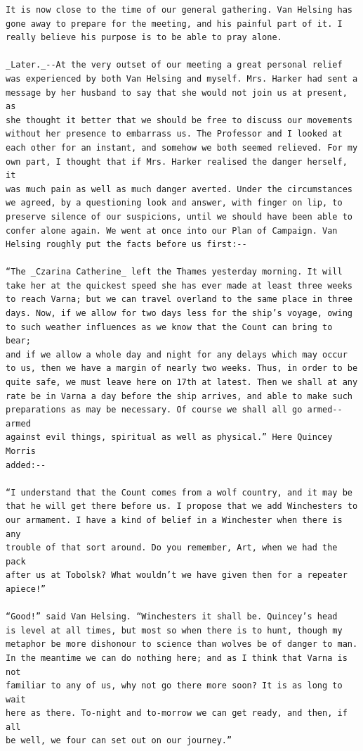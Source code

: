 \documentclass{article}
\begin{document}
\begin{verbatim}
It is now close to the time of our general gathering. Van Helsing has
gone away to prepare for the meeting, and his painful part of it. I
really believe his purpose is to be able to pray alone.

_Later._--At the very outset of our meeting a great personal relief
was experienced by both Van Helsing and myself. Mrs. Harker had sent a
message by her husband to say that she would not join us at present, as
she thought it better that we should be free to discuss our movements
without her presence to embarrass us. The Professor and I looked at
each other for an instant, and somehow we both seemed relieved. For my
own part, I thought that if Mrs. Harker realised the danger herself, it
was much pain as well as much danger averted. Under the circumstances
we agreed, by a questioning look and answer, with finger on lip, to
preserve silence of our suspicions, until we should have been able to
confer alone again. We went at once into our Plan of Campaign. Van
Helsing roughly put the facts before us first:--

“The _Czarina Catherine_ left the Thames yesterday morning. It will
take her at the quickest speed she has ever made at least three weeks
to reach Varna; but we can travel overland to the same place in three
days. Now, if we allow for two days less for the ship’s voyage, owing
to such weather influences as we know that the Count can bring to bear;
and if we allow a whole day and night for any delays which may occur
to us, then we have a margin of nearly two weeks. Thus, in order to be
quite safe, we must leave here on 17th at latest. Then we shall at any
rate be in Varna a day before the ship arrives, and able to make such
preparations as may be necessary. Of course we shall all go armed--armed
against evil things, spiritual as well as physical.” Here Quincey Morris
added:--

“I understand that the Count comes from a wolf country, and it may be
that he will get there before us. I propose that we add Winchesters to
our armament. I have a kind of belief in a Winchester when there is any
trouble of that sort around. Do you remember, Art, when we had the pack
after us at Tobolsk? What wouldn’t we have given then for a repeater
apiece!”

“Good!” said Van Helsing. “Winchesters it shall be. Quincey’s head
is level at all times, but most so when there is to hunt, though my
metaphor be more dishonour to science than wolves be of danger to man.
In the meantime we can do nothing here; and as I think that Varna is not
familiar to any of us, why not go there more soon? It is as long to wait
here as there. To-night and to-morrow we can get ready, and then, if all
be well, we four can set out on our journey.”


\end{verbatim}
\end{document}
